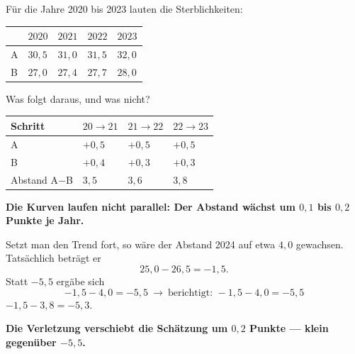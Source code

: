 \begin{aufgabe}
Für die Jahre 2020 bis 2023 lauten die Sterblichkeiten:
\begin{center}
{\small
\renewcommand{\arraystretch}{1.46}
\begin{tabular}{@{}P{1.8cm}P{1.4cm}P{1.4cm}P{1.4cm}P{1.4cm}@{}}
\toprule
& $2020$ & $2021$ & $2022$ & $2023$\\
\midrule
A & $30{,}5$ & $31{,}0$ & $31{,}5$ & $32{,}0$\\
B & $27{,}0$ & $27{,}4$ & $27{,}7$ & $28{,}0$\\
\bottomrule
\end{tabular}}
\end{center}
Was folgt daraus, und was nicht?

\loesung
{}
\begin{center}
{\small
\renewcommand{\arraystretch}{1.46}
\begin{tabular}{@{}P{2.2cm}P{1.4cm}P{1.4cm}P{1.4cm}@{}}
\toprule
\textbf{Schritt} & $20\!\to\!21$ & $21\!\to\!22$ & $22\!\to\!23$\\
\midrule
A & $+0{,}5$ & $+0{,}5$ & $+0{,}5$\\
B & $+0{,}4$ & $+0{,}3$ & $+0{,}3$\\
\midrule
Abstand A$-$B & $3{,}5$ & $3{,}6$ & $3{,}8$\\
\bottomrule
\end{tabular}}
\end{center}

\begin{center}
\begin{minipage}{0.9\textwidth}
\textbf{Die Kurven laufen nicht parallel: Der Abstand wächst um $0{,}1$ bis $0{,}2$ Punkte je Jahr.}
\end{minipage}
\end{center}

Setzt man den Trend fort, so wäre der Abstand 2024 auf etwa $4{,}0$ gewachsen. Tatsächlich beträgt er
\[ 25{,}0 - 26{,}5 = -1{,}5 . \]
Statt $-5{,}5$ ergäbe sich
\[ -1{,}5 - 4{,}0 = -5{,}5 \ \to\ \text{berichtigt: } -1{,}5 - 4{,}0 = -5{,}5 \]
 $-1{,}5 - 3{,}8 = -5{,}3$.

\begin{center}
\begin{minipage}{0.9\textwidth}
\textbf{Die Verletzung verschiebt die Schätzung um $0{,}2$ Punkte --- klein gegenüber $-5{,}5$.}
\end{minipage}
\end{center}


\end{aufgabe}
